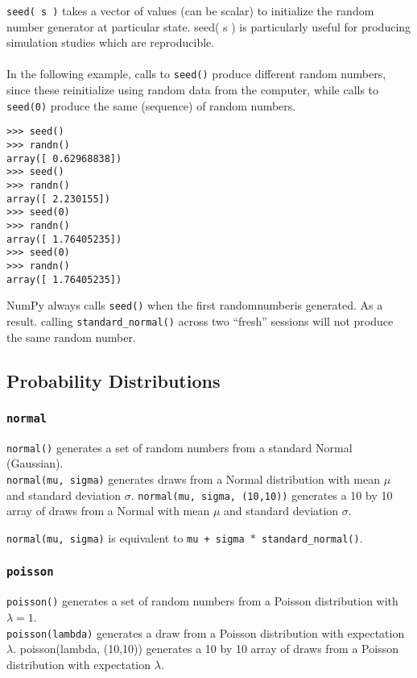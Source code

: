 \documentclass[Pydata.tex]{subfiles}
\begin{document}
\texttt{seed( s )} takes a vector of values (can be scalar) to
initialize the random number generator at particular state. seed( s ) is particularly useful for producing
simulation studies which are reproducible. \\
\\ In the following example, calls to \texttt{seed()} produce different
random numbers, since these reinitialize using random data from the computer, while calls to \texttt{seed(0)}
produce the same (sequence) of random numbers.
\begin{framed}
\begin{verbatim}
>>> seed()
>>> randn()
array([ 0.62968838])
>>> seed()
>>> randn()
array([ 2.230155])
>>> seed(0)
>>> randn()
array([ 1.76405235])
>>> seed(0)
>>> randn()
array([ 1.76405235])
\end{verbatim}
\end{framed}
NumPy always calls \texttt{seed()}  when the first randomnumberis generated. As a result. calling \texttt{standard\_normal()}
across two “fresh” sessions will not produce the same random number.


\newpage
\subsection{Probability Distributions}
\subsubsection{\texttt{normal}}
\texttt{normal()} generates a set of random numbers from a standard Normal (Gaussian).\\ \texttt{normal(mu, sigma)} generates draws from
a Normal distribution with mean $\mu$ and standard deviation $\sigma$. \texttt{normal(mu, sigma, (10,10))} generates a 10 by 10 array
of draws from a Normal with mean $\mu$ and standard deviation $\sigma$. 

\texttt{normal(mu, sigma)} is equivalent to \texttt{mu + sigma $\ast$ \texttt{standard\_normal()}}.
\subsubsection{\texttt{poisson}}
\texttt{poisson()} generates a set of random numbers from a Poisson distribution with $\lambda = 1$.\\ \texttt{poisson(lambda)} generates a draw
from a Poisson distribution with expectation $\lambda$. poisson(lambda, (10,10)) generates a 10 by 10 array of
draws from a Poisson distribution with expectation $\lambda$.
\end{document}
